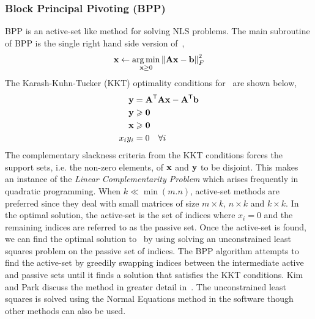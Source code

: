 \subsubsection{Block Principal Pivoting (BPP)}
BPP is an active-set like method for solving NLS problems. The main subroutine of BPP is the single right hand side version of~,
\begin{align}
\V{x} \leftarrow \underset{\V{x} \ge 0}{\argmin} \left\lVert \M{A}\V{x} -\V{b}\right\rVert^2_F
\label{eqn:snls}
\end{align}
The Karash-Kuhn-Tucker (KKT) optimality conditions for~ are shown below,
\begin{subequations}
\begin{align}
\V{y} &= \M{A}^\Tra\M{A}\V{x} - \M{A}^\Tra\V{b} \\
\V{y} &\geq \V{0} \\
\V{x} &\geq \V{0} \\
x_i y_i &= 0 \quad \forall i
\end{align}
\label{eqn:bppkkt}
\end{subequations}
The complementary slackness criteria from the KKT conditions forces the support sets, i.e. the non-zero elements, of $\V{x}$ and $\V{y}$ to be disjoint. This makes~ an instance of the \emph{Linear Complementarity Problem} which arises frequently in quadratic programming. When $k \ll \min(m.n)$, active-set methods are preferred since they deal with small matrices of size $m \times k$, $n \times k$ and $k \times k$. In the optimal solution, the active-set is the set of indices where $x_i = 0$ and the remaining indices are referred to as the passive set. Once the active-set is found, we can find the optimal solution to~ by using solving an unconstrained least squares problem on the passive set of indices. The BPP algorithm attempts to find the active-set by greedily swapping indices between the intermediate active and passive sets until it finds a solution that satisfies the KKT conditions. Kim and Park discuss the method in greater detail in~\cite{KP2011}. The unconstrained least squares is solved using the Normal Equations method in the software though other methods can also be used.

